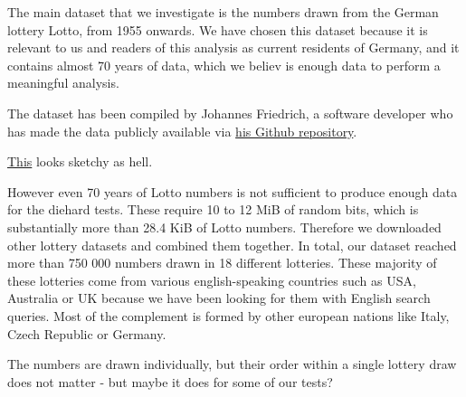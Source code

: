The main dataset that we investigate is the numbers drawn from the German lottery Lotto, from 1955 onwards. 
We have chosen this dataset because it is relevant to us and readers of this analysis as current residents of Germany, 
and it contains almost 70 years of data, which we believ is enough data to perform a meaningful analysis.

The dataset has been compiled by Johannes Friedrich, 
a software developer who has made the data publicly available via 
\href{https://github.com/JohannesFriedrich/LottoNumberArchive}{his Github repository}.



 \href{https://notebook.community/JesseScott/Lotto649/lotto}{This} looks sketchy as hell.

However even 70 years of Lotto numbers is not sufficient to produce enough data for the diehard tests. These require 10 to 12 MiB of random bits, which is
substantially more than 28.4 KiB of Lotto numbers. Therefore we downloaded other lottery datasets and combined them together. In total, our dataset reached
more than 750 000 numbers drawn in 18 different lotteries. These majority of these lotteries come from various english-speaking countries such as USA,
Australia or UK because we have been looking for them with English search queries. Most of the complement is formed by other european nations like Italy,
Czech Republic or Germany.


The numbers are drawn individually, but their order within a single lottery draw does not matter - but maybe it does for some of our tests?

